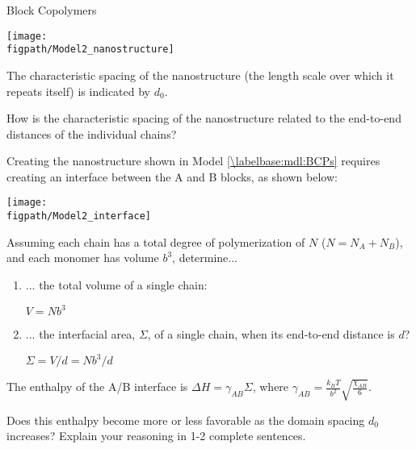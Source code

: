 \begin{activity}[extension]{Block Copolymers}
\begin{model}
	\vspace{6pt}
	\centerline{\texttt{[image: \\figpath/Model2\_nanostructure]}}

The characteristic spacing of the nanostructure (the length scale over which it repeats itself) is indicated by $d_0$.

\end{model}

\begin{ctqs}

	\question How is the characteristic spacing of the nanostructure related to the end-to-end distances of the individual chains?
	
		\begin{solution}[1in]
		\end{solution}
	
	\question Creating the nanostructure shown in Model \ref{\labelbase:mdl:BCPs} requires creating an interface between the A and B blocks, as shown below:
	
	\vspace{6pt}
	\centerline{\texttt{[image: \\figpath/Model2\_interface]}}
	
		Assuming each chain has a total degree of polymerization of $N$ ($N = N_A + N_B$), and each monomer has volume $b^3$, determine...
	
		\begin{enumerate}
			\item ... the total volume of a single chain:
			
				\begin{solution}[0.5in]
					$V = Nb^3$
				\end{solution}
			
			\item ... the interfacial area, $\Sigma$, of a single chain, when its end-to-end distance is $d$?
			
				\begin{solution}[0.5in]
					$\Sigma = V/d = Nb^3/d$ 
				\end{solution}
			
		\end{enumerate}
	
	\question The enthalpy of the A/B interface is $\Delta H = \gamma_{AB} \Sigma$, where $\gamma_{AB} = \frac{k_B T}{b^2}\sqrt{\frac{\chi_{AB}}{6}}$.
	
		Does this enthalpy become more or less favorable as the domain spacing $d_0$ increases?  Explain your reasoning in 1-2 complete sentences.
	

\end{ctqs}
\end{activity}
